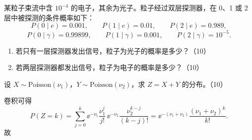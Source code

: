 \begin{question}
某粒子束流中含 $10^{-4}$ 的电子，其余为光子。粒子经过双层探测器，在 0、1 或 2 层中被探测的条件概率如下：
\[
P(0\mid e)=0.001,\qquad P(1\mid e)=0.01,\qquad P(2\mid e)=0.989,
\]
\[
P(0\mid \gamma)=0.99899,\qquad P(1\mid \gamma)=0.001,\qquad P(2\mid \gamma)=10^{-5}.
\]
\begin{enumerate}[label=(\alph*),leftmargin=2.8em,itemsep=0.2em]
\item 若只有一层探测器发出信号，粒子为光子的概率是多少？（10）
\item 若两层探测器都发出信号，粒子为电子的概率是多少？（10）
\end{enumerate}
\begin{solution}

\end{solution}
\end{question}

\begin{question}
设 $X\sim \mathrm{Poisson}(\nu_1)$，$Y\sim \mathrm{Poisson}(\nu_2)$，求 $Z=X+Y$ 的分布。（10）
\begin{solution}
卷积可得
\[
P(Z=k)=\sum_{j=0}^{k}\ee^{-\nu_1}\frac{\nu_1^j}{j!}
\,\ee^{-\nu_2}\frac{\nu_2^{k-j}}{(k-j)!}
=\ee^{-(\nu_1+\nu_2)}\frac{(\nu_1+\nu_2)^k}{k!}.
\]
故
\end{solution}
\end{question}


